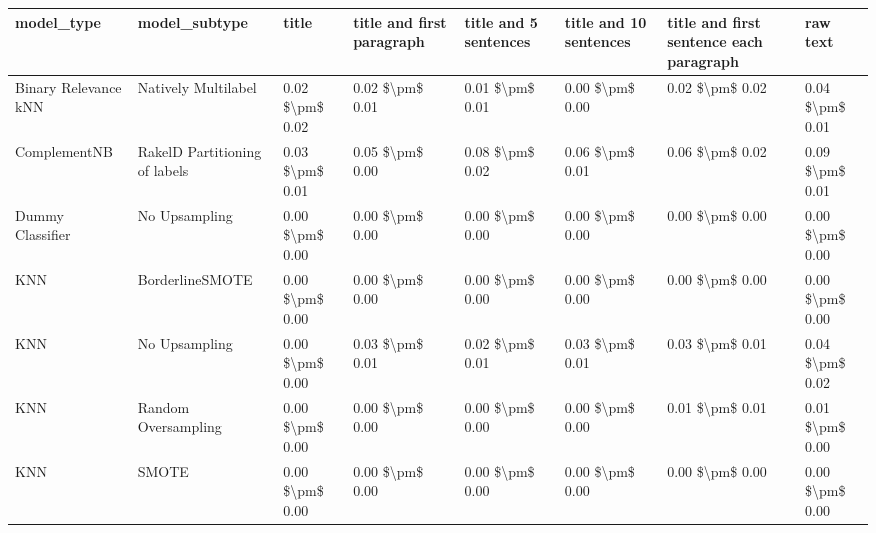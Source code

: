 \begin{tabular}{llllllll}
\toprule
                     model\_type &                 model\_subtype &           title & title and first paragraph & title and 5 sentences & title and 10 sentences & title and first sentence each paragraph &        raw text \\
\midrule
           Binary Relevance kNN &           Natively Multilabel & 0.02 \$\textbackslash pm\$ 0.02 &           0.02 \$\textbackslash pm\$ 0.01 &       0.01 \$\textbackslash pm\$ 0.01 &        0.00 \$\textbackslash pm\$ 0.00 &                         0.02 \$\textbackslash pm\$ 0.02 & 0.04 \$\textbackslash pm\$ 0.01 \\
                   ComplementNB & RakelD Partitioning of labels & 0.03 \$\textbackslash pm\$ 0.01 &           0.05 \$\textbackslash pm\$ 0.00 &       0.08 \$\textbackslash pm\$ 0.02 &        0.06 \$\textbackslash pm\$ 0.01 &                         0.06 \$\textbackslash pm\$ 0.02 & 0.09 \$\textbackslash pm\$ 0.01 \\
               Dummy Classifier &                 No Upsampling & 0.00 \$\textbackslash pm\$ 0.00 &           0.00 \$\textbackslash pm\$ 0.00 &       0.00 \$\textbackslash pm\$ 0.00 &        0.00 \$\textbackslash pm\$ 0.00 &                         0.00 \$\textbackslash pm\$ 0.00 & 0.00 \$\textbackslash pm\$ 0.00 \\
                            KNN &               BorderlineSMOTE & 0.00 \$\textbackslash pm\$ 0.00 &           0.00 \$\textbackslash pm\$ 0.00 &       0.00 \$\textbackslash pm\$ 0.00 &        0.00 \$\textbackslash pm\$ 0.00 &                         0.00 \$\textbackslash pm\$ 0.00 & 0.00 \$\textbackslash pm\$ 0.00 \\
                            KNN &                 No Upsampling & 0.00 \$\textbackslash pm\$ 0.00 &           0.03 \$\textbackslash pm\$ 0.01 &       0.02 \$\textbackslash pm\$ 0.01 &        0.03 \$\textbackslash pm\$ 0.01 &                         0.03 \$\textbackslash pm\$ 0.01 & 0.04 \$\textbackslash pm\$ 0.02 \\
                            KNN &           Random Oversampling & 0.00 \$\textbackslash pm\$ 0.00 &           0.00 \$\textbackslash pm\$ 0.00 &       0.00 \$\textbackslash pm\$ 0.00 &        0.00 \$\textbackslash pm\$ 0.00 &                         0.01 \$\textbackslash pm\$ 0.01 & 0.01 \$\textbackslash pm\$ 0.00 \\
                            KNN &                         SMOTE & 0.00 \$\textbackslash pm\$ 0.00 &           0.00 \$\textbackslash pm\$ 0.00 &       0.00 \$\textbackslash pm\$ 0.00 &        0.00 \$\textbackslash pm\$ 0.00 &                         0.00 \$\textbackslash pm\$ 0.00 & 0.00 \$\textbackslash pm\$ 0.00 \\

\end{tabular}

